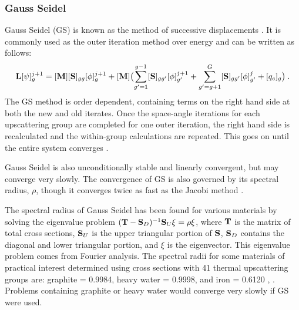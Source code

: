 \subsubsection{Gauss Seidel}
Gauss Seidel (GS) is known as the method of successive displacements \cite{LeVeque2007}. It is commonly used as the outer iteration method over energy and can be written as follows:
%
\begin{equation}
  \mathbf{L} [\psi]_{g}^{j+1} = [\mathbf{M}] [\mathbf{S}]_{gg}[\phi]_{g}^{j+1} +   [\mathbf{M}]\bigl(\sum_{g'=1}^{g-1} [\mathbf{S}]_{gg'}[\phi]_{g'}^{j+1} + \sum_{g'=g+1}^{G} [\mathbf{S}]_{gg'}[\phi]_{g'}^{j} + [q_{e}]_{g} \bigr) \label{eq:GaussSeidel} \:. 
\end{equation}
%
The GS method is order dependent, containing terms on the right hand side at both the new and old iterates. Once the space-angle iterations for each upscattering group are completed for one outer iteration, the right hand side is recalculated and the within-group calculations are repeated. This goes on until the entire system converges \cite{Evans2009d}. 

Gauss Seidel is also unconditionally stable and linearly convergent, but may converge very slowly. The convergence of GS is also governed by its spectral radius, $\rho$, though it converges twice as fast as the Jacobi method \cite{LeVeque2007}. 

The spectral radius of Gauss Seidel has been found for various materials by solving the eigenvalue problem $(\mathbf{T} - \mathbf{S}_{D})^{-1}\mathbf{S}_{U} \xi = \rho \xi$, where $\mathbf{T}$ is the matrix of total cross sections, $\mathbf{S}_{U}$ is the upper triangular portion of $\mathbf{S}$, $\mathbf{S}_{D}$ contains the diagonal and lower triangular portion, and $\xi$ is the eigenvector. This eigenvalue problem comes from Fourier analysis. The spectral radii for some materials of practical interest determined using cross sections with 41 thermal upscattering groups are: graphite = 0.9984, heavy water = 0.9998, and iron = 0.6120 \cite{Adams2002}, \cite{Evans2009d}. Problems containing graphite or heavy water would converge very slowly if GS were used.   

